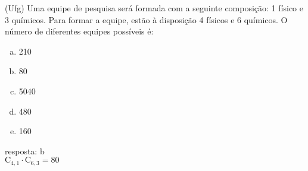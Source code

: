 \begin{ex}
(Ufg) Uma equipe de pesquisa será formada com a seguinte composição: 1 físico e 3 químicos. Para formar a equipe, estão à disposição 4 físicos e 6 químicos. O número de diferentes equipes possíveis é:
   \begin{enumerate}[(a)]
   \item 210
   \item 80
   \item 5040
   \item 480
   \item 160
   \end{enumerate}
     \begin{sol}
      resposta: b \\
      $\mathrm{C}_{4,1}\cdot \mathrm{C}_{6,3}=80$
     \end{sol}
\end{ex}